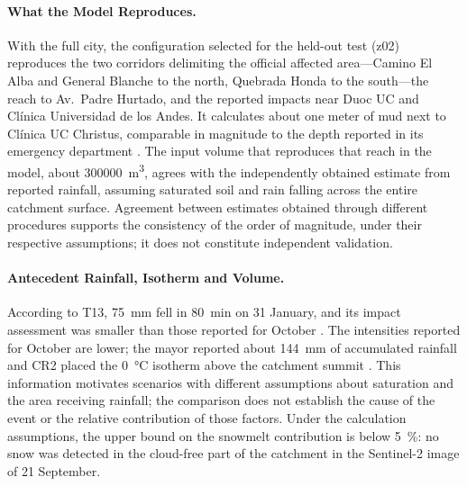 \paragraph{What the Model Reproduces.} With the full city, the configuration selected for the held-out test (z02) reproduces the two corridors delimiting the official affected area---Camino El Alba and General Blanche to the north, Quebrada Honda to the south---the reach to Av.\ Padre Hurtado, and the reported impacts near Duoc UC and Clínica Universidad de los Andes. It calculates about one meter of mud next to Clínica UC Christus, comparable in magnitude to the depth reported in its emergency department \citep{cadena3_2026}. The input volume that reproduces that reach in the model, about \SI{300000}{m^3}, agrees with the independently obtained estimate from reported rainfall, assuming saturated soil and rain falling across the entire catchment surface. Agreement between estimates obtained through different procedures supports the consistency of the order of magnitude, under their respective assumptions; it does not constitute independent validation.

\paragraph{Antecedent Rainfall, Isotherm and Volume.} According to T13, \SI{75}{mm} fell in \SI{80}{min} on 31 January, and its impact assessment was smaller than those reported for October \citep{t13_2026mallas}. The intensities reported for October are lower; the mayor reported about \SI{144}{mm} of accumulated rainfall \citep{interferencia2026} and CR2 placed the \SI{0}{\celsius} isotherm above the catchment summit \citep{cr2_2026}. This information motivates scenarios with different assumptions about saturation and the area receiving rainfall; the comparison does not establish the cause of the event or the relative contribution of those factors. Under the calculation assumptions, the upper bound on the snowmelt contribution is below \SI{5}{\percent}: no snow was detected in the cloud-free part of the catchment in the Sentinel-2 image of 21 September.

